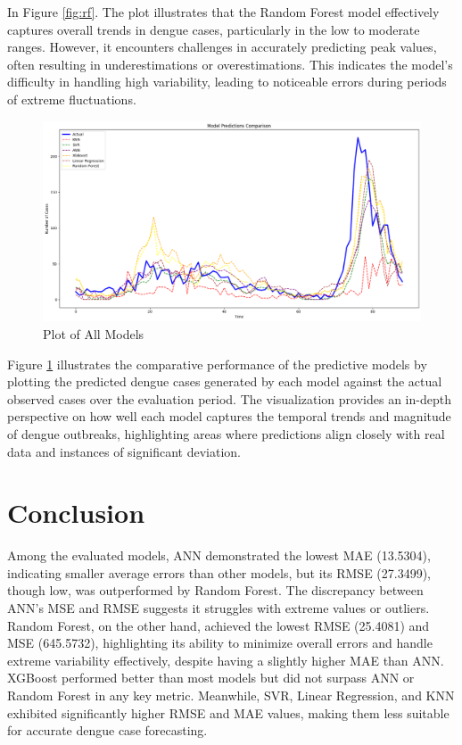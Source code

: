 \documentclass{article}
\begin{document}
In Figure \ref{fig:rf}. The plot illustrates that the Random Forest model effectively captures overall trends in dengue cases, particularly in the low to moderate ranges. However, it encounters challenges in accurately predicting peak values, often resulting in underestimations or overestimations. This indicates the model’s difficulty in handling high variability, leading to noticeable errors during periods of extreme fluctuations.\pagebreak

\begin{figure}[h!]
    \centering
    \includegraphics[width=1\linewidth]{image/All model plot.png}
    \caption{Plot of All Models}
    \label{fig:all}
\end{figure}

Figure \ref{fig:all} illustrates the comparative performance of the predictive models by plotting the predicted dengue cases generated by each model against the actual observed cases over the evaluation period. The visualization provides an in-depth perspective on how well each model captures the temporal trends and magnitude of dengue outbreaks, highlighting areas where predictions align closely with real data and instances of significant deviation.

\section{Conclusion}
Among the evaluated models, ANN demonstrated the lowest MAE (13.5304), indicating smaller average errors than other models, but its RMSE (27.3499), though low, was outperformed by Random Forest. The discrepancy between ANN's MSE and RMSE suggests it struggles with extreme values or outliers. Random Forest, on the other hand, achieved the lowest RMSE (25.4081) and MSE (645.5732), highlighting its ability to minimize overall errors and handle extreme variability effectively, despite having a slightly higher MAE than ANN. XGBoost performed better than most models but did not surpass ANN or Random Forest in any key metric. Meanwhile, SVR, Linear Regression, and KNN exhibited significantly higher RMSE and MAE values, making them less suitable for accurate dengue case forecasting.
\end{document}
